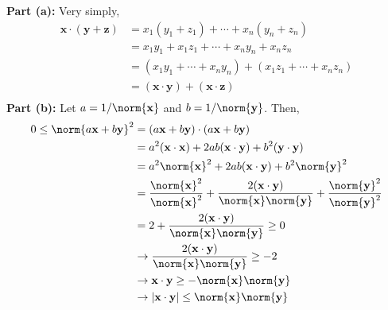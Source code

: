 \documentclass[11pt]{article}
\renewcommand{\b}[1]{\ensuremath{\mathbf{#1}}}
\begin{document}
\begin{homeworkProblem}
    \textbf{Part (a):} Very simply,
    \begin{align*}
        \b{x} \cdot (\b{y} + \b{z}) & = x_1 (y_1 + z_1) + \cdots + x_n (y_n + z_n)                  \\
                                    & = x_1 y_1 + x_1 z_1 + \cdots + x_n y_n + x_n z_n              \\
                                    & = (x_1 y_1 + \cdots + x_n y_n) + (x_1 z_1 + \cdots + x_n z_n) \\
                                    & = (\b{x} \cdot \b{y}) + (\b{x} \cdot \b{z})                   \\
    \end{align*}
    \textbf{Part (b):} Let $a = 1/\norm{\b{x}}$ and $b = 1/\norm{\b{y}}$. Then,
    \begin{align*}
        0 \leq \norm{a \b{x} + b \b{y}}^2 & = (a \b{x} + b \b{y}) \cdot (a \b{x} + b \b{y})                                                                                          \\
                                          & = a^2 (\b{x} \cdot \b{x}) + 2ab (\b{x} \cdot \b{y}) + b^2 (\b{y} \cdot \b{y})                                                            \\
                                          & = a^2 \norm{\b{x}}^2 + 2ab (\b{x} \cdot \b{y}) + b^2 \norm{\b{y}}^2                                                                      \\
                                          & = \frac{\norm{\b{x}}^2}{\norm{\b{x}}^2} + \frac{2(\b{x} \cdot \b{y})}{\norm{\b{x}} \norm{\b{y}}} + \frac{\norm{\b{y}}^2}{\norm{\b{y}}^2} \\
                                          & = 2 + \frac{2(\b{x} \cdot \b{y})}{\norm{\b{x}} \norm{\b{y}}} \geq 0                                                                      \\
                                          & \rightarrow \frac{2(\b{x}\cdot\b{y})}{\norm{\b{x}} \norm{\b{y}}} \geq -2                                                                 \\
                                          & \rightarrow \b{x} \cdot \b{y} \geq -\norm{\b{x}} \norm{\b{y}}                                                                            \\
                                          & \rightarrow |\b{x} \cdot \b{y}| \leq \norm{\b{x}} \norm{\b{y}}                                                                           \\
    \end{align*}


\end{homeworkProblem}
\end{document}
